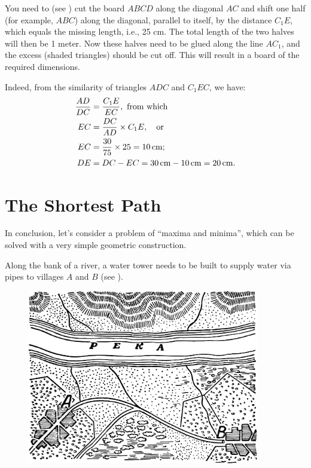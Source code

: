 You need to (see ) cut the board $ABCD$ along the diagonal $AC$ and shift one half (for example, $ABC$) along the diagonal, parallel to itself, by the distance $C_{1}E$, which equals the missing length, i.e., 25 cm. The total length of the two halves will then be 1 meter. Now these halves need to be glued along the line $AC_{1}$, and the excess (shaded triangles) should be cut off. This will result in a board of the required dimensions.

Indeed, from the similarity of triangles $ADC$ and $C_{1}EC$, we have:
\begin{align*}%
\frac{AD}{DC} & = \frac{C_{1}E}{EC},\, \, \text{from which}\\
EC & = \frac{DC}{AD} \times C_{1}E, \qor \\
EC & = \frac{30}{75} \times 25 = \SI{10}{\centi\meter};\\
DE & = DC - EC =  \SI{30}{\centi\meter} -  \SI{10}{\centi\meter} =  \SI{20}{\centi\meter}.
\end{align*}



\section{The Shortest Path}
\label{sec-12.15}

In conclusion, let’s consider a problem of ``maxima and minima'', which can be solved with a very simple geometric construction.


\ques Along the bank of a river, a water tower needs to be built to supply water via pipes to villages $A$ and $B$ (see ).


\begin{figure}[h!]
\centering
\includegraphics[width=0.9\textwidth]{figures/ch-12/fig-191.pdf}
\end{figure}


